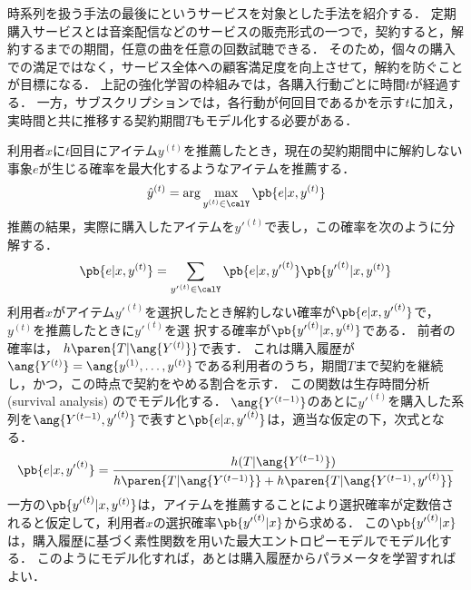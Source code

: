 時系列を扱う手法の最後にというサービスを対象とした手法を紹介する\cite{kdd:06:02}．
定期購入サービスとは音楽配信などのサービスの販売形式の一つで，契約すると，解約するまでの期間，任意の曲を任意の回数試聴できる．
そのため，個々の購入での満足ではなく，サービス全体への顧客満足度を向上させて，解約を防ぐことが目標になる．
上記の強化学習の枠組みでは，各購入行動ごとに時間$t$が経過する．
一方，サブスクリプションでは，各行動が何回目であるかを示す$t$に加え，実時間と共に推移する契約期間$T$もモデル化する必要がある．

利用者$x$に$t$回目にアイテム$y^{(t)}$を推薦したとき，現在の契約期間中に解約しない事象$e$が生じる確率を最大化するようなアイテムを推薦する．
\[
 \hat{y}^{(t)}=\arg\max_{y^{(t)}\in\calY}\pb{e|x,y^{(t)}}
\]
推薦の結果，実際に購入したアイテムを${y'}^{(t)}$で表し，この確率を次のように分解する．
\[
\pb{e|x,y^{(t)}}=
\sum_{{y'}^{(t)}\in\calY}
\pb{e|x,{y'}^{(t)}} \pb{{y'}^{(t)}|x,y^{(t)}}
\]
利用者$x$がアイテム${y'}^{(t)}$を選択したとき解約しない確率が$\pb{e|x,{y'}^{(t)}}$で，$y^{(t)}$を推薦したときに${y'}^{(t)}$を選
択する確率が$\pb{{y'}^{(t)}|x,y^{(t)}}$である．
前者の確率は， $h\paren{T|\ang{Y^{(t)}}}$で表す．
これは購入履歴が$\ang{Y^{(t)}}=\ang{y^{(1)},\dotsc,y^{(t)}}$である利用者のうち，期間$T$まで契約を継続し，かつ，この時点で契約をやめる割合を示す．
この関数は生存時間分析 (survival analysis) のでモデル化する．
$\ang{Y^{(t-1)}}$のあとに${y'}^{(t)}$を購入した系列を$\ang{Y^{(t-1)},{y'}^{(t)}}$で表すと$\pb{e|x,{y'}^{(t)}}$は，適当な仮定の下，次式となる．
\[
\pb{e|x,{y'}^{(t)}}=
\frac{h(T|\ang{Y^{(t-1)}})}{h\paren{T|\ang{Y^{(t-1)}}}+h\paren{T|\ang{Y^{(t-1)},{y'}^{(t)}}}}
\]
一方の$\pb{{y'}^{(t)}|x,y^{(t)}}$は，アイテムを推薦することにより選択確率が定数倍されると仮定して，利用者$x$の選択確率$\pb{{y'}^{(t)}|x}$から求める．
この$\pb{{y'}^{(t)}|x}$は，購入履歴に基づく素性関数を用いた最大エントロピーモデルでモデル化する．
このようにモデル化すれば，あとは購入履歴からパラメータを学習すればよい．
